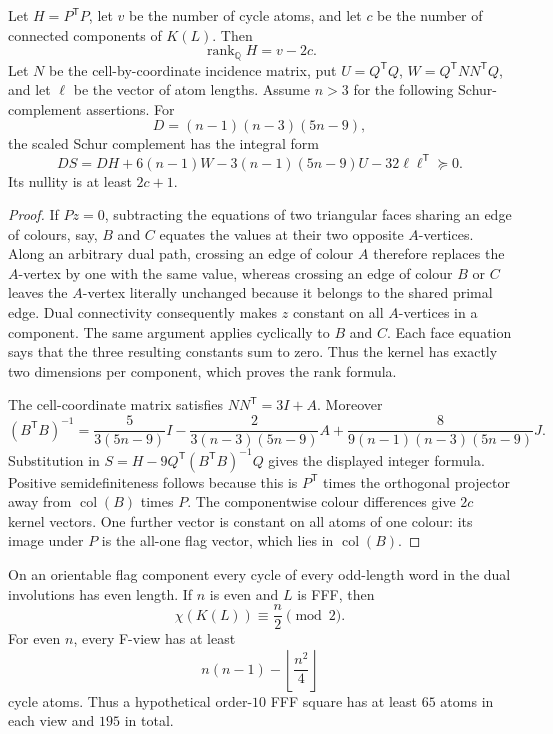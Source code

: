 \begin{theorem}\label{thm:flag-atom-projection}
Let $H=P^{\mathsf T}P$, let $v$ be the number of cycle atoms, and let $c$
be the number of connected components of $K(L)$.  Then
\[
 \operatorname{rank}_{\mathbb Q}H=v-2c.
\]
Let $N$ be the cell-by-coordinate incidence matrix, put
$U=Q^{\mathsf T}Q$, $W=Q^{\mathsf T}NN^{\mathsf T}Q$, and let
$\boldsymbol\ell$ be the vector of atom lengths.
Assume $n>3$ for the following Schur-complement assertions.  For
\[
 D=(n-1)(n-3)(5n-9),
\]
the scaled Schur complement has the integral form
\[
 DS=DH+6(n-1)W-3(n-1)(5n-9)U
       -32\boldsymbol\ell\boldsymbol\ell^{\mathsf T}\succeq0.
\]
Its nullity is at least $2c+1$.
\end{theorem}

\begin{proof}
If $Pz=0$, subtracting the equations of two triangular faces sharing an edge
of colours, say, $B$ and $C$ equates the values at their two opposite
$A$-vertices.  Along an arbitrary dual path, crossing an edge of colour $A$
therefore replaces the $A$-vertex by one with the same value, whereas crossing
an edge of colour $B$ or $C$ leaves the $A$-vertex literally unchanged because
it belongs to the shared primal edge.  Dual connectivity consequently makes
$z$ constant on all $A$-vertices in a component.  The same argument applies
cyclically to $B$ and $C$.  Each face equation says that the three resulting
constants sum to zero.  Thus the kernel has exactly two dimensions per
component, which proves the rank formula.

The cell-coordinate matrix satisfies $NN^{\mathsf T}=3I+A$.  Moreover
\[
 (B^{\mathsf T}B)^{-1}
 =\frac5{3(5n-9)}I
 -\frac2{3(n-3)(5n-9)}A
 +\frac8{9(n-1)(n-3)(5n-9)}J.
\]
Substitution in $S=H-9Q^{\mathsf T}(B^{\mathsf T}B)^{-1}Q$ gives the
displayed integer formula.  Positive semidefiniteness follows because this
is $P^{\mathsf T}$ times the orthogonal projector away from
$\operatorname{col}(B)$ times $P$.  The componentwise colour differences
give $2c$ kernel vectors.  One further vector is constant on all atoms of
one colour: its image under $P$ is the all-one flag vector, which lies in
$\operatorname{col}(B)$.
\end{proof}

\begin{corollary}
\label{cor:flag-topological-sign-cut}
On an orientable flag component every cycle of every odd-length word in the
dual involutions has even length.  If $n$ is even and $L$ is FFF, then
\[
 \chi(K(L))\equiv \frac n2\pmod2.
\]
For even $n$, every F-view has at least
\[
 n(n-1)-\left\lfloor\frac{n^2}{4}\right\rfloor
\]
cycle atoms.  Thus a hypothetical order-$10$ FFF square has at least $65$
atoms in each view and $195$ in total.
\end{corollary}

